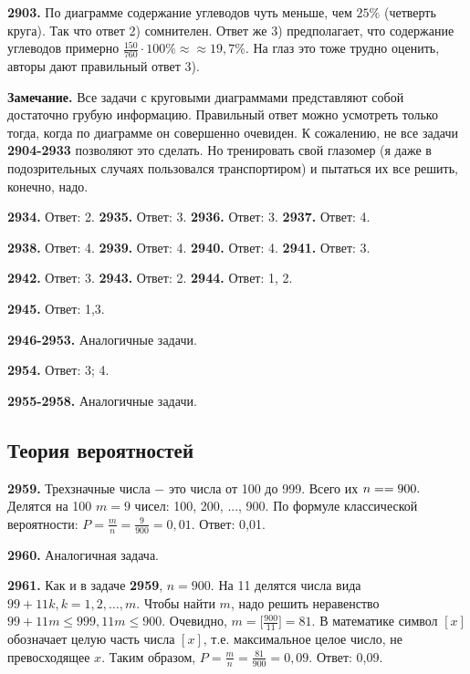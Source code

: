 \textbf{2903.} По диаграмме содержание углеводов чуть меньше, чем $25\%$ (четверть круга). Так что ответ 2) сомнителен. Ответ же 3) предполагает, что содержание углеводов примерно $\frac{150}{760}\cdot100\%\approx$\newline$\approx19,7\%$. На глаз это тоже трудно оценить, авторы дают правильный ответ 3).

\textbf{Замечание.} Все задачи с круговыми диаграммами представляют собой достаточно грубую информацию. Правильный ответ можно усмотреть только тогда, когда по диаграмме он совершенно очевиден. К сожалению, не все задачи \textbf{2904-2933} позволяют это сделать. Но тренировать свой глазомер (я даже в подозрительных случаях пользовался транспортиром) и пытаться их все решить, конечно, надо.

\textbf{2934.} Ответ: 2. \textbf{2935.} Ответ: 3. \textbf{2936.} Ответ: 3. \textbf{2937.} Ответ: 4.

\textbf{2938.} Ответ: 4. \textbf{2939.} Ответ: 4. \textbf{2940.} Ответ: 4. \textbf{2941.} Ответ: 3.

 \textbf{2942.} Ответ: 3. \textbf{2943.} Ответ: 2. \textbf{2944.} Ответ: 1, 2.

\textbf{2945.} Ответ: 1,3. 

\textbf{2946-2953.} Аналогичные задачи.

\textbf{2954.} Ответ: 3; 4.

\textbf{2955-2958.} Аналогичные задачи.

\subsection{Теория вероятностей}

\textbf{2959.} Трехзначные числа $-$ это числа от 100 до 999. Всего их $n=\linebreak=900.$ Делятся на 100 $m=9$ чисел: 100, 200, ..., 900. По формуле классической вероятности: $P=\frac{m}{n}=\frac{9}{900}=0,01.$ \newline \null \hspace*{\fill} Ответ: 0,01. 

\textbf{2960.} Аналогичная задача.

\textbf{2961.} Как и в задаче \textbf{2959}, $n=900$. На 11 делятся числа вида $99+11k, k=1, 2, \dots, m.$ Чтобы найти $m$, надо решить неравенство $99+11m\leq999, 11m\leq900.$ Очевидно, $m=\bigg[\frac{900}{11}\bigg]=81.$ В математике символ $[x]$ обозначает целую часть числа $[x]$, т.е. максимальное целое число, не превосходящее $x$. Таким образом, $P = \frac{m}{n}=\frac{81}{900}=0,09.$ \newline \null \hspace*{\fill} Ответ: 0,09. 

